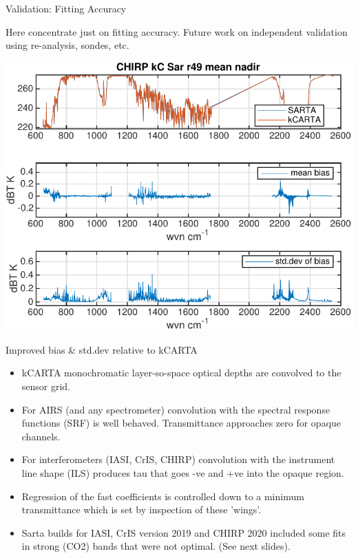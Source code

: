 \documentclass[10pt,t]{beamer}
\begin{document}
\begin{frame}[shrink=5]{Validation: Fitting Accuracy}

Here concentrate just on fitting accuracy.  Future work on independent validation using re-analysis, sondes, etc.

      \begin{center}
    \includegraphics[width=0.6\linewidth]{./Figs/chirp_49regr_sar_kc_bias_stdv.pdf}
  \end{center}
  

\end{frame}
\begin{frame}{Improved bias \& std.dev relative to kCARTA}

  \begin{itemize}
  \item kCARTA monochromatic layer-so-space optical depths are convolved to the sensor grid.
  \item For AIRS (and any spectrometer) convolution with the spectral response functions (SRF) is well behaved. Transmittance approaches zero for opaque channels.
  \item For interferometers (IASI, CrIS, CHIRP) convolution with the instrument line shape (ILS) produces tau that goes -ve and +ve into the opaque region.
  \item Regression of the fast coefficients is controlled down to a minimum transmittance which is set by inspection of these 'wings'.
  \item Sarta builds for IASI, CrIS version 2019 and CHIRP 2020 included some fits in strong (CO2) bands that were not optimal. (See next slides).
  \end{itemize}

\end{frame}
\end{document}
